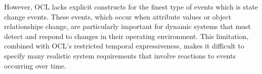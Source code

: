 However, OCL lacks explicit constructs for the finest type of events which is state change 
events. These events, which occur when attribute values or object relationships 
change, are particularly important for dynamic systems that must detect and 
respond to changes in their operating environment. This limitation, combined with OCL's restricted temporal 
expressiveness, makes it difficult to specify many realistic system requirements 
that involve reactions to events occurring over time.

